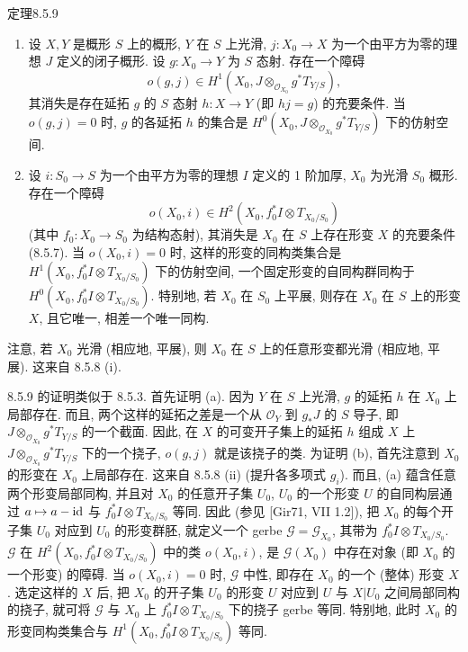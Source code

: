 \begin{origstatement}{定理}{8.5.9}\label{ch08:th859}
\begin{enumerate}
\item[(a)] 设 $X,Y$ 是概形 $S$ 上的概形, $Y$ 在 $S$ 上光滑, $j:X_0\to X$ 为一个由平方为零的理想 $J$ 定义的闭子概形. 设 $g:X_0\to Y$ 为 $S$ 态射. 存在一个障碍
\[o(g,j)\in H^1(X_0,J\otimes_{\mathcal O_{X_0}}g^*T_{Y/S}),\]
其消失是存在延拓 $g$ 的 $S$ 态射 $h:X\to Y$ (即 $hj=g$) 的充要条件. 当 $o(g,j)=0$ 时, $g$ 的各延拓 $h$ 的集合是 $H^0(X_0,J\otimes_{\mathcal O_{X_0}}g^*T_{Y/S})$ 下的仿射空间.
\item[(b)] 设 $i:S_0\to S$ 为一个由平方为零的理想 $I$ 定义的 1 阶加厚, $X_0$ 为光滑 $S_0$ 概形. 存在一个障碍
\[o(X_0,i)\in H^2(X_0,f_0^*I\otimes T_{X_0/S_0})\]
(其中 $f_0:X_0\to S_0$ 为结构态射), 其消失是 $X_0$ 在 $S$ 上存在形变 $X$ 的充要条件 (8.5.7). 当 $o(X_0,i)=0$ 时, 这样的形变的同构类集合是 $H^1(X_0,f_0^*I\otimes T_{X_0/S_0})$ 下的仿射空间, 一个固定形变的自同构群同构于 $H^0(X_0,f_0^*I\otimes T_{X_0/S_0})$. 特别地, 若 $X_0$ 在 $S_0$ 上平展, 则存在 $X_0$ 在 $S$ 上的形变 $X$, 且它唯一, 相差一个唯一同构.
\end{enumerate}
\end{origstatement}
注意, 若 $X_0$ 光滑 (相应地, 平展), 则 $X_0$ 在 $S$ 上的任意形变都光滑 (相应地, 平展). 这来自 8.5.8 (i).

8.5.9 的证明类似于 8.5.3. 首先证明 (a). 因为 $Y$ 在 $S$ 上光滑, $g$ 的延拓 $h$ 在 $X_0$ 上局部存在. 而且, 两个这样的延拓之差是一个从 $\mathcal O_Y$ 到 $g_*J$ 的 $S$ 导子, 即 $J\otimes_{\mathcal O_{X_0}}g^*T_{Y/S}$ 的一个截面. 因此, 在 $X$ 的可变开子集上的延拓 $h$ 组成 $X$ 上 $J\otimes_{\mathcal O_{X_0}}g^*T_{Y/S}$ 下的一个挠子, $o(g,j)$ 就是该挠子的类. 为证明 (b), 首先注意到 $X_0$ 的形变在 $X_0$ 上局部存在. 这来自 8.5.8 (ii) (提升各多项式 $g_i$). 而且, (a) 蕴含任意两个形变局部同构, 并且对 $X_0$ 的任意开子集 $U_0$, $U_0$ 的一个形变 $U$ 的自同构层通过 $a\mapsto a-\mathrm{id}$ 与 $f_0^*I\otimes T_{X_0/S_0}$ 等同. 因此 (参见 [Gir71, VII 1.2]), 把 $X_0$ 的每个开子集 $U_0$ 对应到 $U_0$ 的形变群胚, 就定义一个 gerbe $\mathcal G=\mathcal G_{X_0}$, 其带为 $f_0^*I\otimes T_{X_0/S_0}$. $\mathcal G$ 在 $H^2(X_0,f_0^*I\otimes T_{X_0/S_0})$ 中的类 $o(X_0,i)$, 是 $\mathcal G(X_0)$ 中存在对象 (即 $X_0$ 的一个形变) 的障碍. 当 $o(X_0,i)=0$ 时, $\mathcal G$ 中性, 即存在 $X_0$ 的一个 (整体) 形变 $X$. 选定这样的 $X$ 后, 把 $X_0$ 的开子集 $U_0$ 的形变 $U$ 对应到 $U$ 与 $X|U_0$ 之间局部同构的挠子, 就可将 $\mathcal G$ 与 $X_0$ 上 $f_0^*I\otimes T_{X_0/S_0}$ 下的挠子 gerbe 等同. 特别地, 此时 $X_0$ 的形变同构类集合与 $H^1(X_0,f_0^*I\otimes T_{X_0/S_0})$ 等同.

